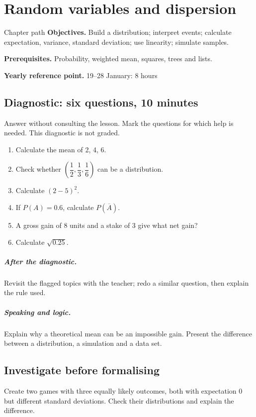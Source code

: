\chapter{Random variables and dispersion}\label{C08}
\begin{repere}{Chapter path}
\textbf{Objectives.} Build a distribution; interpret events; calculate expectation, variance, standard deviation; use linearity; simulate samples.

\textbf{Prerequisites.} Probability, weighted mean, squares, trees and lists.

\textbf{Yearly reference point.} 19--28 January: 8 hours\end{repere}
\section*{Diagnostic: six questions, 10 minutes}\label{C08-D}
Answer without consulting the lesson. Mark the questions for which help is needed. This diagnostic is not graded.
\begin{enumerate}
\item Calculate the mean of 2, 4, 6.
\item Check whether $(\dfrac{1}{2},\dfrac{1}{3},\dfrac{1}{6})$ can be a distribution.
\item Calculate $(2-5)^2$.
\item If $P(A)=0.6$, calculate $P(\overline A)$.
\item A gross gain of 8 units and a stake of 3 give what net gain?
\item Calculate $\sqrt{0.25}$.
\end{enumerate}
\paragraph{After the diagnostic.} Revisit the flagged topics with the teacher; redo a similar question, then explain the rule used.
\paragraph{Speaking and logic.} Explain why a theoretical mean can be an impossible gain. Present the difference between a distribution, a simulation and a data set.
\clearpage
\section*{Investigate before formalising}\label{C08-RECH}
Create two games with three equally likely outcomes, both with expectation 0 but different standard deviations. Check their distributions and explain the difference.
